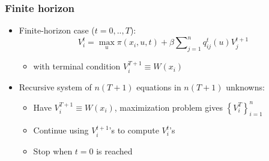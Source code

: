\documentclass[bigger,handout]{beamer}
\newenvironment{stepitemize}{\begin{itemize}[<+->]}{\end{itemize} }
\begin{document}
\begin{frame}%

\frametitle{Finite horizon}

\begin{stepitemize}
\item Finite-horizon case ($t=0,..,T$):
\begin{equation*}
V_{i}^{t}=\max_{u}\pi (x_{i},u,t)+\beta
\sum\nolimits_{j=1}^{n}q_{ij}^{t}(u)V_{j}^{t+1}
\end{equation*}

\begin{itemize}
\item with terminal condition $V_{i}^{T+1}\equiv W(x_{i})$
\end{itemize}

\item Recursive system of $n\left( T+1\right) $ equations in $n\left(
T+1\right) $ unknowns:

\begin{stepitemize}
\item Have $V_{i}^{T+1}\equiv W(x_{i})$, maximization problem gives $\left\{
V_{i}^{T}\right\} _{i=1}^{n}$

\item Continue using $V_{i}^{t+1}$'s to compute $V_{i}^{t}$'s

\item Stop when $t=0$ is reached
\end{stepitemize}
\end{stepitemize}



\end{frame}%
\end{document}
